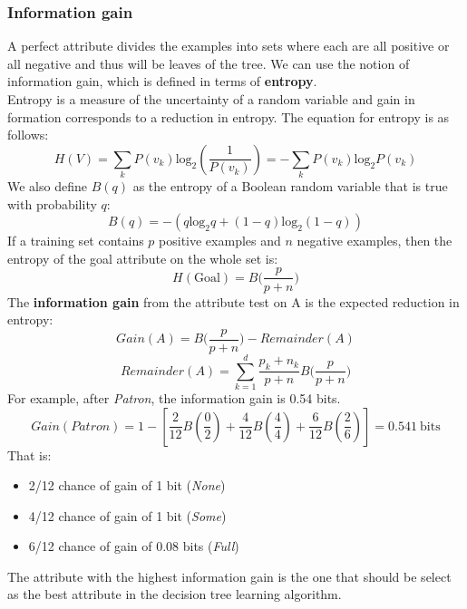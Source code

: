 \documentclass{article}
\newcommand{\n}[0]{\\[\baselineskip]}
\begin{document}
\subsubsection{Information gain}
A perfect attribute divides the examples into sets where each are all positive or all negative and thus will be leaves of the tree. We can use the notion of information gain, which is defined in terms of \textbf{entropy}.
\n
Entropy is a measure of the uncertainty of a random variable and gain in formation corresponds to a reduction in entropy. The equation for entropy is as follows:
\begin{equation}
H(V) = \sum_{k}P(v_{k})\text{log}_{2}(\frac{1}{P(v_{k})}) = - \sum_{k}P(v_{k})\text{log}_{2}P(v_{k})
\end{equation}
We also define $B(q)$ as the entropy of a Boolean random variable that is true with probability $q$:
\begin{equation}
B(q) = -(q\text{log}_{2}q + (1 - q)\text{log}_{2}(1 - q))
\end{equation}
If a training set contains $p$ positive examples and $n$ negative examples, then the entropy of the goal attribute on the whole set is:
\begin{equation}
H(\text{Goal}) = B\bigg(\frac{p}{p+n}\bigg)
\end{equation}
The \textbf{information gain} from the attribute test on A is the expected reduction in entropy:
\begin{equation}
Gain(A) = B\bigg(\frac{p}{p+n}\bigg) - Remainder(A)
\end{equation}
\begin{equation}
Remainder(A) = \sum_{k=1}^{d}\frac{p_{k} + n_{k}}{p + n}B\bigg(\frac{p}{p+n}\bigg)
\end{equation}
For example, after \textit{Patron}, the information gain is 0.54 bits.
\begin{equation}
Gain(Patron) = 1 - [\frac{2}{12}B(\frac{0}{2}) + \frac{4}{12}B(\frac{4}{4}) + \frac{6}{12}B(\frac{2}{6})] = 0.541\ \text{bits}
\end{equation}
That is:
\begin{itemize}
\item 2/12 chance of gain of 1 bit (\textit{None})
\item 4/12 chance of gain of 1 bit (\textit{Some})
\item 6/12 chance of gain of 0.08 bits (\textit{Full})
\end{itemize}
The attribute with the highest information gain is the one that should be select as the best attribute in the decision tree learning algorithm.
\end{document}
